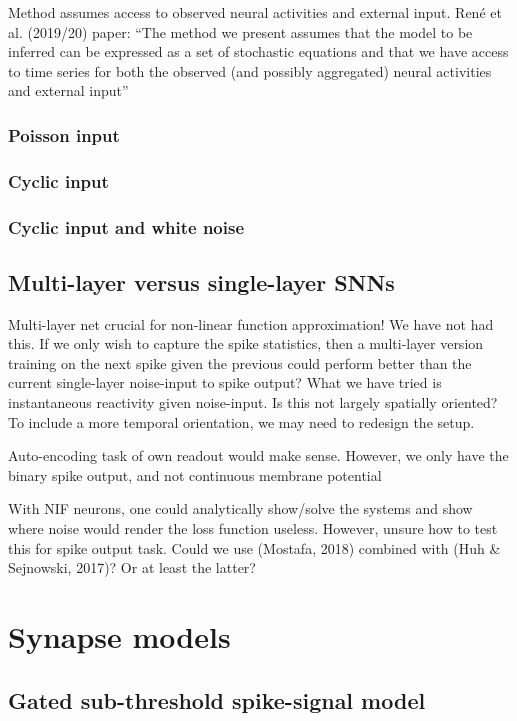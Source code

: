 \documentclass[mphil,deptreport,ai]{infthesis} %
\begin{document}
Method assumes access to observed neural activities and external input.
René et al. (2019/20) paper:
“The method we present assumes that the model to be inferred can be expressed as a
set of stochastic equations and that we have access to time series for both the observed (and possibly aggregated) neural activities and external input”


\subsubsection{Poisson input}

\subsubsection{Cyclic input}

\subsubsection{Cyclic input and white noise}

\subsection{Multi-layer versus single-layer SNNs}

Multi-layer net crucial for non-linear function approximation! We have not had this. If we only wish to capture the spike statistics, then a multi-layer version training on the next spike given the previous could perform better than the current single-layer noise-input to spike output?
What we have tried is instantaneous reactivity given noise-input. Is this not largely spatially oriented? To include a more temporal orientation, we may need to redesign the setup.

Auto-encoding task of own readout would make sense. However, we only have the binary spike output, and not continuous membrane potential

With NIF neurons, one could analytically show/solve the systems and show where noise would render the loss function useless. However, unsure how to test this for spike output task. Could we use (Mostafa, 2018) combined with (Huh \& Sejnowski, 2017)? Or at least the latter?

\section{Synapse models}

\subsection{Gated sub-threshold spike-signal model}
\end{document}
